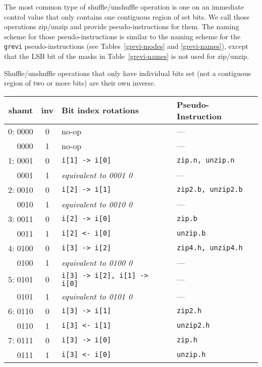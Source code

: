 The most common type of shuffle/unshuffle operation is one on an immediate
control value that only contains one contiguous region of set bits. We call
those operations zip/unzip and provide pseudo-instructions for them. The naming
scheme for those pseudo-instructions is similar to the naming scheme for the
{\tt grevi} pseudo-instructions (see Tables~\ref{grevi-modes} and
\ref{grevi-names}), except that the LSB bit of the masks in Table~\ref{grevi-names}
is not used for zip/unzip.

Shuffle/unshuffle operations that only have individual bits set (not a contiguous
region of two or more bits) are their own inverse.

\begin{table}[h]
\begin{small}
\begin{center}
\begin{tabular}{r c l l}
\multicolumn{1}{c}{shamt} &
\multicolumn{1}{c}{inv} &
Bit index rotations &
Pseudo-Instruction \\

\hline

 0: 0000 & 0 & no-op                            & ---                    \\
    0000 & 1 & no-op                            & ---                    \\
 1: 0001 & 0 & {\tt i[1] -> i[0]}               & {\tt zip.n, unzip.n}   \\
    0001 & 1 & {\it equivalent to 0001 0}       & ---                    \\
 2: 0010 & 0 & {\tt i[2] -> i[1]}               & {\tt zip2.b, unzip2.b} \\
    0010 & 1 & {\it equivalent to 0010 0}       & ---                    \\
 3: 0011 & 0 & {\tt i[2] -> i[0]}               & {\tt zip.b}            \\
    0011 & 1 & {\tt i[2] <- i[0]}               & {\tt unzip.b}          \\

\hline

 4: 0100 & 0 & {\tt i[3] -> i[2]}               & {\tt zip4.h, unzip4.h} \\
    0100 & 1 & {\it equivalent to 0100 0}       & ---                    \\
 5: 0101 & 0 & {\tt i[3] -> i[2], i[1] -> i[0]} & ---                    \\
    0101 & 1 & {\it equivalent to 0101 0}       & ---                    \\
 6: 0110 & 0 & {\tt i[3] -> i[1]}               & {\tt zip2.h}           \\
    0110 & 1 & {\tt i[3] <- i[1]}               & {\tt unzip2.h}         \\
 7: 0111 & 0 & {\tt i[3] -> i[0]}               & {\tt zip.h}            \\
    0111 & 1 & {\tt i[3] <- i[0]}               & {\tt unzip.h}          \\


\end{tabular}
\end{center}
\end{small}
\end{table}

